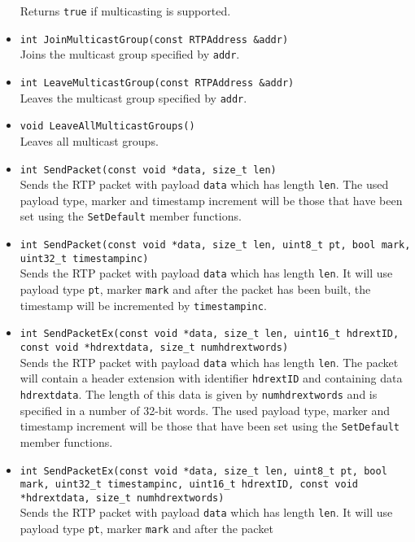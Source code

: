 \documentclass[12pt,a4paper]{article}
\begin{document}
\begin{itemize}
						Returns {\tt true} if multicasting is supported.
					\item {\tt int JoinMulticastGroup(const RTPAddress \&addr)}\\
						Joins the multicast group specified by {\tt addr}.
					\item {\tt int LeaveMulticastGroup(const RTPAddress \&addr)}\\
						Leaves the multicast group specified by {\tt addr}.
					\item {\tt void LeaveAllMulticastGroups()}\\
						Leaves all multicast groups.
					\item {\tt int SendPacket(const void *data, size\_t len)}\\
						Sends the RTP packet with payload {\tt data} which has length {\tt len}.
						The used payload type, marker and timestamp increment will be those that
						have been set using the {\tt SetDefault} member functions.
					\item {\tt int SendPacket(const void *data, size\_t len,
					                          uint8\_t pt, bool mark, uint32\_t timestampinc)}\\
						Sends the RTP packet with payload {\tt data} which has length {\tt len}.
						It will use payload type {\tt pt}, marker {\tt mark} and after the packet
						has been built, the timestamp will be incremented by {\tt timestampinc}.
					\item {\tt int SendPacketEx(const void *data, size\_t len,
					                            uint16\_t hdrextID, const void *hdrextdata, size\_t numhdrextwords)}\\
						Sends the RTP packet with payload {\tt data} which has length {\tt len}.
						The packet will contain a header extension with identifier {\tt hdrextID} and
						containing data {\tt hdrextdata}. The length of this data is given by
						{\tt numhdrextwords} and is specified in a number of 32-bit words.
						The used payload type, marker and timestamp increment will be those that
						have been set using the {\tt SetDefault} member functions.
					\item {\tt int SendPacketEx(const void *data, size\_t len,
					                            uint8\_t pt, bool mark, uint32\_t timestampinc,
					                            uint16\_t hdrextID, const void *hdrextdata, size\_t numhdrextwords)}\\
						Sends the RTP packet with payload {\tt data} which has length {\tt len}.
						It will use payload type {\tt pt}, marker {\tt mark} and after the packet

\end{itemize}
\end{document}
